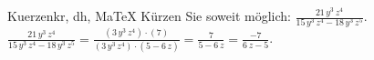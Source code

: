 \begin{MAufgabe}{Kuerzen}{kr, dh, MaTeX}
K\"urzen Sie soweit m\"oglich: $\frac{21\, y^3\, z^4}{15\, y^3\, z^4 - 18\, y^3\, z^5}$.\\ 
\ifLsg\MLoesung
\quad $\frac{21\, y^3\, z^4}{15\, y^3\, z^4 - 18\, y^3\, z^5}=\frac{(3\, y^3\, z^4)\cdot(7)}{(3\, y^3\, z^4)\cdot(5 - 6\, z)}=\frac{7}{5 - 6\, z}=\frac{-7}{6\, z - 5}$.\else\relax\fi
 \end{MAufgabe}